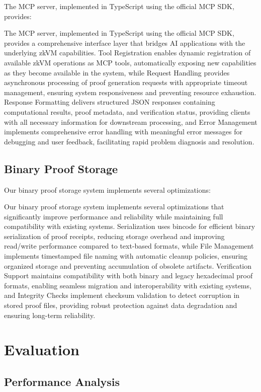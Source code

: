 \documentclass[11pt]{article}
\begin{document}
The MCP server, implemented in TypeScript using the official MCP SDK, provides:

The MCP server, implemented in TypeScript using the official MCP SDK, provides a comprehensive interface layer that bridges AI applications with the underlying zkVM capabilities. Tool Registration enables dynamic registration of available zkVM operations as MCP tools, automatically exposing new capabilities as they become available in the system, while Request Handling provides asynchronous processing of proof generation requests with appropriate timeout management, ensuring system responsiveness and preventing resource exhaustion. Response Formatting delivers structured JSON responses containing computational results, proof metadata, and verification status, providing clients with all necessary information for downstream processing, and Error Management implements comprehensive error handling with meaningful error messages for debugging and user feedback, facilitating rapid problem diagnosis and resolution.

\subsection{Binary Proof Storage}

Our binary proof storage system implements several optimizations:

Our binary proof storage system implements several optimizations that significantly improve performance and reliability while maintaining full compatibility with existing systems. Serialization uses bincode for efficient binary serialization of proof receipts, reducing storage overhead and improving read/write performance compared to text-based formats, while File Management implements timestamped file naming with automatic cleanup policies, ensuring organized storage and preventing accumulation of obsolete artifacts. Verification Support maintains compatibility with both binary and legacy hexadecimal proof formats, enabling seamless migration and interoperability with existing systems, and Integrity Checks implement checksum validation to detect corruption in stored proof files, providing robust protection against data degradation and ensuring long-term reliability.

\section{Evaluation}
\label{sec:evaluation}

\subsection{Performance Analysis}
\end{document}
